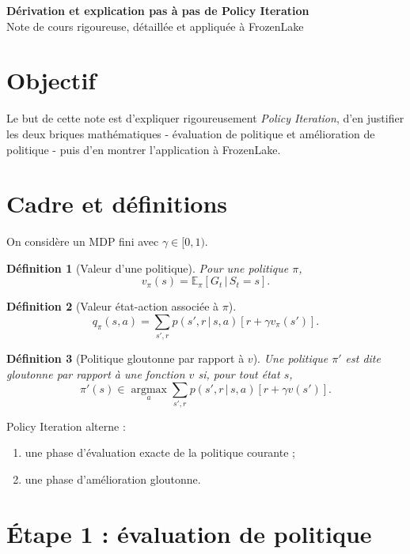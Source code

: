 \documentclass[11pt,a4paper]{article}
\newtheorem*{definition}{Définition}
\newcommand{\E}{\mathbb{E}}
\newcommand{\argmax}{\operatorname*{argmax}}
\newcommand{\given}{\,|\,}
\begin{document}
\begin{center}
    {\LARGE\bfseries Dérivation et explication pas à pas de Policy Iteration}\\[0.4em]
    {\large Note de cours rigoureuse, détaillée et appliquée à FrozenLake}
\end{center}

\vspace{0.6em}

\section{Objectif}

Le but de cette note est d'expliquer rigoureusement \emph{Policy Iteration}, d'en justifier les deux briques mathématiques - évaluation de politique et amélioration de politique - puis d'en montrer l'application à FrozenLake.

\section{Cadre et définitions}

On considère un MDP fini avec $\gamma\in[0,1)$.

\begin{definition}[Valeur d'une politique]
Pour une politique $\pi$,
\[
v_{\pi}(s)=\E_{\pi}[G_t \given S_t=s].
\]
\end{definition}

\begin{definition}[Valeur état-action associée à $\pi$]
\[
q_{\pi}(s,a)=\sum_{s',r} p(s',r\given s,a)\left[r+\gamma v_{\pi}(s')\right].
\]
\end{definition}

\begin{definition}[Politique gloutonne par rapport à $v$]
Une politique $\pi'$ est dite gloutonne par rapport à une fonction $v$ si, pour tout état $s$,
\[
\pi'(s)\in \argmax_a \sum_{s',r} p(s',r\given s,a)\left[r+\gamma v(s')\right].
\]
\end{definition}

Policy Iteration alterne :
\begin{enumerate}[leftmargin=1.6em]
    \item une phase d'évaluation exacte de la politique courante ;
    \item une phase d'amélioration gloutonne.
\end{enumerate}

\section{Étape 1 : évaluation de politique}
\end{document}
